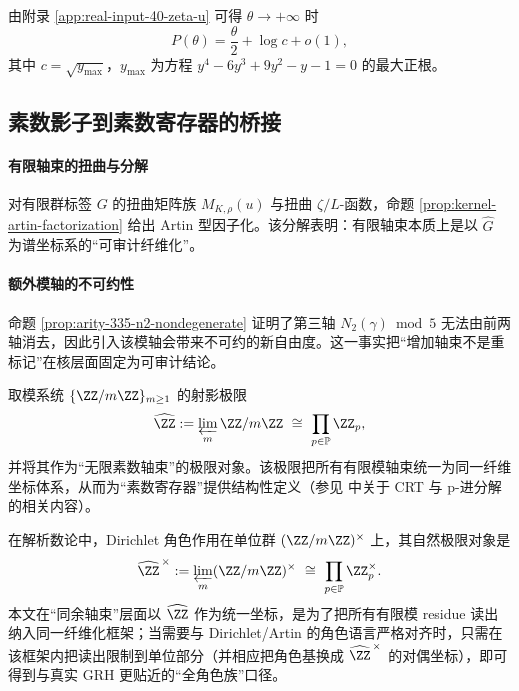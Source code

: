 \begin{corollary}[零温极限常数]\label{cor:pom-pressure-zero-temp}
由附录 \ref{app:real-input-40-zeta-u} 可得 $\theta\to+\infty$ 时
\[
P(\theta)=\frac{\theta}{2}+\log c+o(1),
\]
其中 $c=\sqrt{y_{\max}}$，$y_{\max}$ 为方程 $y^4-6y^3+9y^2-y-1=0$ 的最大正根。
\end{corollary}



\subsection{素数影子到素数寄存器的桥接}\label{subsec:pom-prime-bridge}
\paragraph{有限轴束的扭曲与分解}
对有限群标签 $G$ 的扭曲矩阵族 $M_{K,\rho}(u)$ 与扭曲 $\zeta/L$-函数，命题 \ref{prop:kernel-artin-factorization} 给出 Artin 型因子化。该分解表明：有限轴束本质上是以 $\widehat G$ 为谱坐标系的“可审计纤维化”。

\paragraph{额外模轴的不可约性}
命题 \ref{prop:arity-335-n2-nondegenerate} 证明了第三轴 $N_2(\gamma)\bmod 5$ 无法由前两轴消去，因此引入该模轴会带来不可约的新自由度。这一事实把“增加轴束不是重标记”在核层面固定为可审计结论。

\begin{definition}[素数寄存器纤维的极限口径]\label{def:pom-profinite}
取模系统 $\{\ZZ/m\ZZ\}_{m\ge 1}$ 的射影极限
\[
\widehat{\ZZ}:=\varprojlim_m \ZZ/m\ZZ\ \cong\ \prod_{p\in\mathbb{P}}\ZZ_p,
\]
并将其作为“无限素数轴束”的极限对象。该极限把所有有限模轴束统一为同一纤维坐标体系，从而为“素数寄存器”提供结构性定义（参见 \cite{Apostol1976} 中关于 CRT 与 p-进分解的相关内容）。
\end{definition}

\begin{remark}\label{rem:pom-profinite-units}
在解析数论中，Dirichlet 角色作用在单位群 $(\ZZ/m\ZZ)^\times$ 上，其自然极限对象是
\[
\widehat{\ZZ}^{\,\times}:=\varprojlim_m (\ZZ/m\ZZ)^\times\ \cong\ \prod_{p\in\mathbb{P}}\ZZ_p^\times.
\]
本文在“同余轴束”层面以 $\widehat{\ZZ}$ 作为统一坐标，是为了把所有有限模 residue 读出纳入同一纤维化框架；当需要与 Dirichlet/Artin 的角色语言严格对齐时，只需在该框架内把读出限制到单位部分（并相应把角色基换成 $\widehat{\ZZ}^{\,\times}$ 的对偶坐标），即可得到与真实 GRH 更贴近的“全角色族”口径。
\end{remark}

